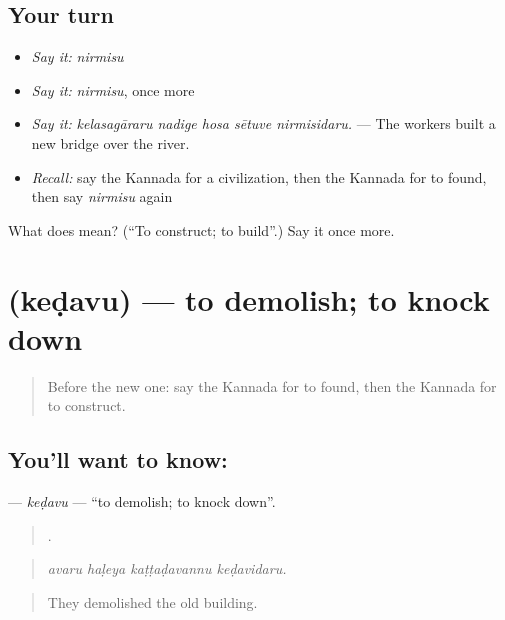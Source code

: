 \subsection*{Your turn}
\begin{itemize}
\raggedright
  \item \emph{Say it:} \emph{nirmisu}
  \item \emph{Say it:} \emph{nirmisu}, once more
  \item \emph{Say it:} \emph{kelasagāraru nadige hosa sētuve nirmisidaru.} — The workers built a new bridge over the river.
  \item \emph{Recall:} say the Kannada for a civilization, then the Kannada for to found, then say \emph{nirmisu} again
\end{itemize}

\begin{tcolorbox}[breakable,colback=teal!4,colframe=teal!35!black,title={Before you move on}]
What does  mean? (\textquotedblleft{}To construct; to build\textquotedblright{}.) Say it once more.
\end{tcolorbox}
\section[\texorpdfstring{\kn{ಕೆಡವು} (keḍavu)}{ಕೆಡವು (keḍavu)}]{ (keḍavu) — to demolish; to knock down}

\label{lesson:KA-C362-kedavu}



\begin{quote}
Before the new one: say the Kannada for to found, then the Kannada for to construct.
\end{quote}

\subsection*{You'll want to know: }
\textbf{} — \emph{keḍavu} — \textquotedblleft{}to demolish; to knock down\textquotedblright{}.

\begin{quote}
   .
\end{quote}

\begin{quote}
\emph{avaru haḷeya kaṭṭaḍavannu keḍavidaru.}
\end{quote}

\begin{quote}
They demolished the old building.
\end{quote}

